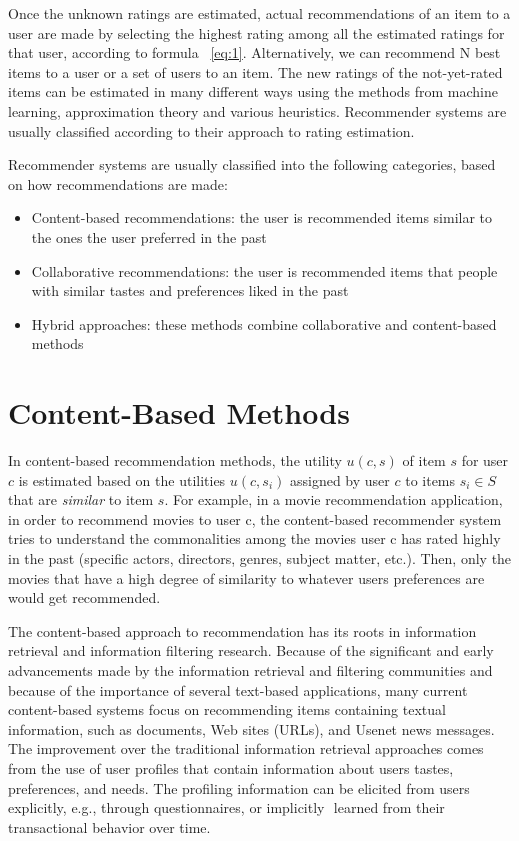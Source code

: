 Once the unknown ratings are estimated, actual recommendations of an item to a user are made by selecting the highest rating among all the estimated ratings for that user, according to formula ~\ref{eq:1}. Alternatively, we can recommend N best items to a user or a set of users to an item.
The new ratings of the not-yet-rated items can be estimated in many different ways using the methods from machine learning, approximation theory and various heuristics. Recommender systems are usually classified according to their approach to rating estimation.

Recommender systems are usually classified into the following categories, based on how recommendations are made:
\begin{itemize}
	\item Content-based recommendations: the user is recommended items similar to the ones the user preferred in the past
	\item Collaborative recommendations: the user is recommended items that people with similar tastes and preferences liked in the past
	\item Hybrid approaches: these methods combine collaborative and content-based methods
\end{itemize}


\section{Content-Based Methods}
In content-based recommendation methods, the utility $u(c, s)$ of item $s$ for user $c$ is estimated based on the utilities $u(c ,s_i)$  assigned by user $c$ to items $s_i \in S$ that are \textit{similar} to item $s$. For example, in a movie recommendation application, in order to recommend movies to user c, the content-based recommender system tries to understand the commonalities among the movies user c has rated highly in the past (specific actors, directors, genres, subject matter, etc.). Then, only the movies that have a high degree of similarity to whatever users preferences are would get recommended.

The content-based approach to recommendation has its roots in information retrieval \citep{recom_7} \citep{recom_89} and information filtering \citep{recom_10} research. Because of the significant and early advancements made by the information retrieval and filtering communities and because of the importance of several text-based applications, many current content-based systems focus on recommending items containing textual information, such as documents, Web sites (URLs), and Usenet news messages. The improvement over the traditional information retrieval approaches comes from the use of user profiles that contain information about users tastes, preferences, and needs. The profiling information can be elicited from users explicitly, e.g., through questionnaires, or implicitly  learned from their transactional behavior over time.

